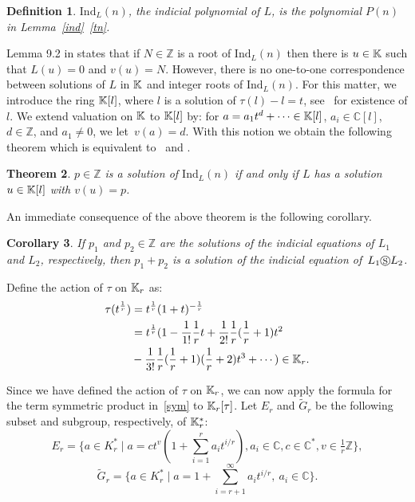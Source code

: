 \documentclass{article}
\newtheorem{theorem}{Theorem}[section]
\newtheorem{corollary}[theorem]{Corollary}
\newtheorem{definition}[theorem]{Definition}
\newcommand{\Z}{{\mathbb{Z}}} \newcommand{\Q}{{\mathbb{Q}}}
\newcommand{\C}{{\mathbb{C}}} \newcommand{\N}{{\mathbb{N}}}
\newcommand{\ind}{\mathrm{Ind}}
\begin{document}
\begin{definition}
	$\ind_L(n)$, the {\em indicial polynomial} of $L$, is the polynomial $P(n)$ in Lemma~\ref{ind}~\eqref{tn}.
\end{definition}

Lemma 9.2 in \cite{CHG10} states that if $N \in \Z$ is a root of $\ind_L(n)$ then there is $u \in
{\mathbb{K}}$ such that $L(u)=0$ and $v(u)=N$.  However, there is no one-to-one correspondence
between solutions of $L$ in ${\mathbb{K}}$ and integer roots of
$\ind_L(n)$. For this matter, we introduce the ring ${\mathbb{K}}[l]$, where $l$ is a solution of $\tau(l) - l =
t$, see~\cite{LF99} for existence of $l$.  We extend valuation on ${\mathbb{K}}$ to ${\mathbb{K}}[l]$ by: for
$a=a_1t^d+\cdots \in {\mathbb{K}}[l]$, $a_i \in \C[l]$, $d \in \Z$, and $a_1 \neq 0$, we
let~$v(a)=d$.  With this notion we obtain the following theorem which is equivalent
to~\cite[Theorem 3.2.10]{YC11} and \cite[Lemma 6.1]{PS97}.

\begin{theorem}
 $p \in \Z$ is a solution of $\ind_L(n)$ if and only if $L$ has a solution $u \in {\mathbb{K}}[l]$ with $v(u)=p$. 
\end{theorem}

An immediate consequence of the above theorem is the following corollary.

\begin{corollary}
\label{indsym}
If $p_1$ and $p_2 \in \Z$ are the solutions of the indicial equations of $L_1$ and $L_2$,
respectively, then $p_1+p_2$ is a solution of the indicial equation of~$L_1 \circledS L_2$.
\end{corollary}






Define the action of $\tau$ on ${\mathbb{K}}_r$ as:
\begin{equation}
\label{acttau}
\begin{split}
\tau(t^{\frac1r}) &= t^{\frac1r} (1+t)^{-\frac1r}\\
            &=t^{\frac1r} (1 - \frac{1}{1!}\frac1r t + \frac{1}{2!}\frac1r(\frac1r+1) t^2 \\
            & -\frac{1}{3!}\frac1r(\frac1r+1)(\frac1r+2) t^3 + \cdots ) \in {\mathbb{K}}_r.
\end{split}
\end{equation}

Since we have defined the action of $\tau$ on ${\mathbb{K}}_r$, we can now apply the formula for the
term symmetric product in~\eqref{sym} to ${\mathbb{K}}_r[\tau]$.  Let $E_r$ and $\tilde{G}_r$ be the
following subset and subgroup, respectively, of ${\mathbb{K}}_r^*$:
$$
E_r=\biggr\{a \in K_r^* \mid a=ct^v(1+\displaystyle\sum_{i=1}^r a_i t^{i/r}), a_i \in \C,
c \in \C^*, v \in \tfrac1r\Z\biggl\},
$$
$$\tilde{G}_r=\biggr\{ a \in K_r^* \mid a=1+\displaystyle\sum_{i=r+1}^{\infty} a_i t^{i/r} , \ a_i \in \C \biggl\}.$$
\end{document}
